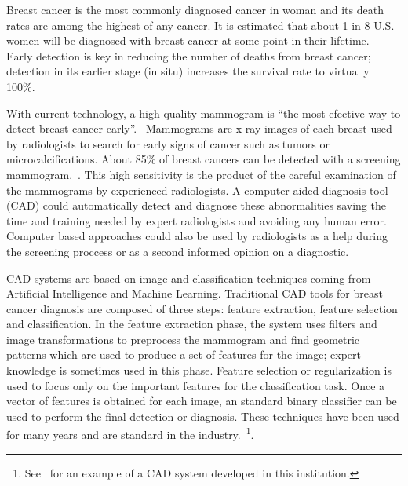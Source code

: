 Breast cancer is the most commonly diagnosed cancer in woman and its death rates are among the highest of any cancer. It is estimated that about 1 in 8 U.S. women will be diagnosed with breast cancer at some point in their lifetime.~\cite{CSR2014} Early detection is key in reducing the number of deaths from breast cancer; detection in its earlier stage (in situ) increases the survival rate to virtually 100\%.~\cite{CSR2014}

With current technology, a high quality mammogram is ``the most efective way to detect breast cancer early''.~\cite{MammogramFactSheet2014} Mammograms are x-ray images of each breast used by radiologists to search for early signs of cancer such as tumors or microcalcifications. About 85\% of breast cancers can be detected with a screening mammogram.~\cite{PerformanceMammography2013}. This high sensitivity is the product of the careful examination of the mammograms by experienced radiologists. A computer-aided diagnosis tool (CAD) could automatically detect and diagnose these abnormalities saving the time and training needed by expert radiologists and avoiding any human error. Computer based approaches could also be used by radiologists as a help during the screening proccess or as a second informed opinion on a diagnostic.

CAD systems are based on image and classification techniques coming from Artificial Intelligence and Machine Learning. Traditional CAD tools for breast cancer diagnosis are composed of three steps: feature extraction, feature selection and classification. In the feature extraction phase, the system uses filters and image transformations to preprocess the mammogram and find geometric patterns which are used to produce a set of features for the image; expert knowledge is sometimes used in this phase. Feature selection or regularization is used to focus only on the important features for the classification task. Once a vector of features is obtained for each image, an standard binary classifier can be used to perform the final detection or diagnosis. These techniques have been used for many years and are standard in the industry.~\footnote{See~\cite{Hernandez2014} for an example of a CAD system developed in this institution.}.

